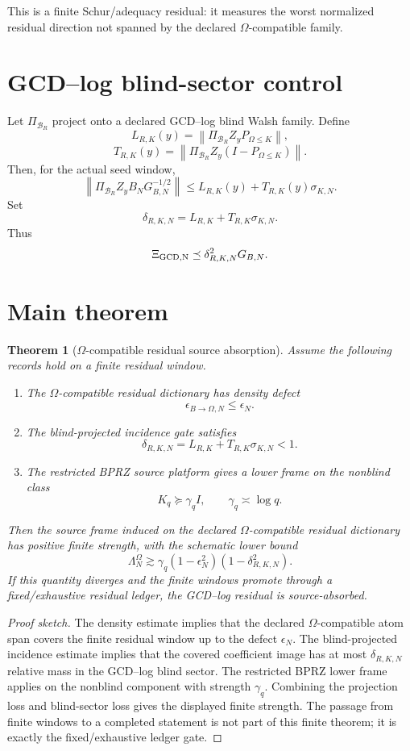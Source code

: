 \documentclass[11pt]{article}
\newtheorem{theorem}{Theorem}
\begin{document}
This is a finite Schur/adequacy residual: it measures the worst normalized residual direction not spanned by the declared $\Omega$-compatible family.

\section{GCD--log blind-sector control}

Let $\Pi_{\mathcal B_R}$ project onto a declared GCD--log blind Walsh family.  Define
\[
L_{R,K}(y)=\left\|\Pi_{\mathcal B_R}Z_yP_{\Omega\le K}\right\|,
\]
\[
T_{R,K}(y)=\left\|\Pi_{\mathcal B_R}Z_y(I-P_{\Omega\le K})\right\|.
\]
Then, for the actual seed window,
\[
\left\|\Pi_{\mathcal B_R}Z_yB_NG_{B,N}^{-1/2}\right\|
\le
L_{R,K}(y)+T_{R,K}(y)\sigma_{K,N}.
\]
Set
\[
\delta_{R,K,N}=L_{R,K}+T_{R,K}\sigma_{K,N}.
\]
Thus
\[
\Xi_{\rm GCD,N}\preceq \delta_{R,K,N}^2G_{B,N}.
\]

\section{Main theorem}

\begin{theorem}[$\Omega$-compatible residual source absorption]
Assume the following records hold on a finite residual window.
\begin{enumerate}
\item The $\Omega$-compatible residual dictionary has density defect
\[
\epsilon_{B\to\Omega,N}\le \epsilon_N.
\]
\item The blind-projected incidence gate satisfies
\[
\delta_{R,K,N}=L_{R,K}+T_{R,K}\sigma_{K,N}<1.
\]
\item The restricted BPRZ source platform gives a lower frame on the nonblind class
\[
K_q\succeq \gamma_q I,
\qquad \gamma_q\asymp \log q.
\]
\end{enumerate}
Then the source frame induced on the declared $\Omega$-compatible residual dictionary has positive finite strength, with the schematic lower bound
\[
\Lambda_N^\Omega
\gtrsim
\gamma_q(1-\epsilon_N^2)(1-
\delta_{R,K,N}^2).
\]
If this quantity diverges and the finite windows promote through a fixed/exhaustive residual ledger, the GCD--log residual is source-absorbed.
\end{theorem}

\begin{proof}[Proof sketch]
The density estimate implies that the declared $\Omega$-compatible atom span covers the finite residual window up to the defect $\epsilon_N$.  The blind-projected incidence estimate implies that the covered coefficient image has at most $\delta_{R,K,N}$ relative mass in the GCD--log blind sector.  The restricted BPRZ lower frame applies on the nonblind component with strength $\gamma_q$.  Combining the projection loss and blind-sector loss gives the displayed finite strength.  The passage from finite windows to a completed statement is not part of this finite theorem; it is exactly the fixed/exhaustive ledger gate.
\end{proof}
\end{document}
